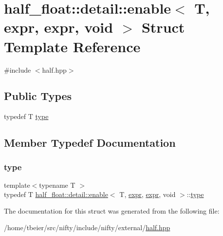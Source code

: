 \hypertarget{structhalf__float_1_1detail_1_1enable_3_01T_00_01expr_00_01expr_00_01void_01_4}{}\section{half\+\_\+float\+:\+:detail\+:\+:enable$<$ T, expr, expr, void $>$ Struct Template Reference}
\label{structhalf__float_1_1detail_1_1enable_3_01T_00_01expr_00_01expr_00_01void_01_4}


{\ttfamily \#include $<$half.\+hpp$>$}

\subsection*{Public Types}
\begin{DoxyCompactItemize}
\item 
typedef T \hyperlink{structhalf__float_1_1detail_1_1enable_3_01T_00_01expr_00_01expr_00_01void_01_4_ac5b0ec94780275726b1deadc8affc811}{type}
\end{DoxyCompactItemize}


\subsection{Member Typedef Documentation}
\mbox{\label{structhalf__float_1_1detail_1_1enable_3_01T_00_01expr_00_01expr_00_01void_01_4_ac5b0ec94780275726b1deadc8affc811}} 
\subsubsection{\texorpdfstring{type}{type}}
{\footnotesize\ttfamily template$<$typename T $>$ \\
typedef T \hyperlink{structhalf__float_1_1detail_1_1enable}{half\+\_\+float\+::detail\+::enable}$<$ T, \hyperlink{structhalf__float_1_1detail_1_1expr}{expr}, \hyperlink{structhalf__float_1_1detail_1_1expr}{expr}, void $>$\+::\hyperlink{structhalf__float_1_1detail_1_1enable_3_01T_00_01expr_00_01expr_00_01void_01_4_ac5b0ec94780275726b1deadc8affc811}{type}}



The documentation for this struct was generated from the following file\+:\begin{DoxyCompactItemize}
\item 
/home/tbeier/src/nifty/include/nifty/external/\hyperlink{half_8hpp}{half.\+hpp}\end{DoxyCompactItemize}
